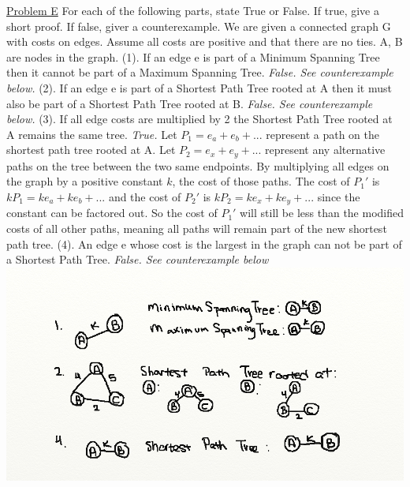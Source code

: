 \documentclass{article}
\begin{document}
\underline{Problem E}\newline{}
For each of the following parts, state True or False. If true, give a short proof. If false, giver a
counterexample. We are given a connected graph G with costs on edges. Assume all costs are positive and
that there are no ties. A, B are nodes in the graph.\newline{}
(1). If an edge e is part of a Minimum Spanning Tree then it cannot be part of a Maximum Spanning Tree. \textit{False. See counterexample below.}\newline{}
(2). If an edge e is part of a Shortest Path Tree rooted at A then it must also be part of a Shortest Path
Tree rooted at B. \textit{False. See counterexample below.}\newline{}
(3). If all edge costs are multiplied by 2 the Shortest Path Tree rooted at A remains the same tree.
\newline{}
\textit{True.} Let $P_1=e_a+e_b+...$ represent a path on the shortest path tree rooted at A. Let $P_2=e_x+e_y+...$ represent any alternative paths on the tree between the two same endpoints. By multiplying all edges on the graph by a positive constant $k$, the cost of those paths. The cost of $P_1'$ is $kP_1=ke_a+ke_b+...$ and the cost of $P_2'$ is $kP_2=ke_x+ke_y+...$ since the constant can be factored out. So the cost of $P_1'$ will still be less than the modified costs of all other paths, meaning all paths will remain part of the new shortest path tree.
\newline{}
(4). An edge e whose cost is the largest in the graph can not be part of a Shortest Path Tree. \textit{False. See counterexample below}\newline{}
\includegraphics[width=\textwidth]{testams304.png}
\end{document}

